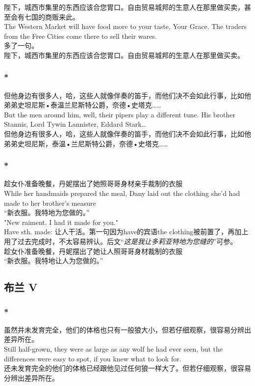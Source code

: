 \documentclass[12pt,a4paper]{article}
\newcommand{\h}[1]{{\color{red}#1}\\}
\newcommand{\la}[1]{{\color{blue}#1}\\}
\begin{document}
\subsubsection{}\la{
	 陛下，城西市集里的东西应该合您胃口。自由贸易城邦的生意人在那里做买卖，甚至会有七国的商贩来此。\\
	 The Western Market will have food more to your taste, Your Grace. The traders from the Free Cities come there to sell their wares.}\h{
	 多了一句。}
	 陛下，城西市集里的东西应该合您胃口。自由贸易城邦的生意人在那里做买卖。
	 
\subsubsection{\color{red}*}\la{
	但他身边有很多人，哈，这些人就像伴奏的笛手，而他们决不会如此行事，比如他弟弟史坦尼斯•泰温兰尼斯特公爵，奈德•史塔克……\\
	But the men around him, well, their pipers play a different tune. His brother Stannis, Lord Tywin Lannister, Eddard Stark\ldots}
	但他身边有很多人，哈，这些人就像伴奏的笛手，而他们决不会如此行事，比如他弟弟史坦尼斯，泰温•兰尼斯特公爵，奈德•史塔克……
	
\subsubsection{\color{red}*}\la{
	趁女仆准备晚餐，丹妮摆出了她照哥哥身材亲手裁制的衣服\\
	While her handmaids prepared the meal, Dany laid out the clothing she'd had made to her brother's measure\\
	“新衣服。我特地为您做的。”\\
	"New raiment. I had it made for you."}\h{
	Have sth. made: 让人干活。第一句因为have的宾语the clothing被前置了，再加上用了过去完成时，不太容易辨认。后文“\emph{这是我让多莉亚特地为您缝的}”可参。}
	趁女仆准备晚餐，丹妮摆出了她让人照哥哥身材裁制的衣服\\
	“新衣服。我特地让人为您做的。”　
	
				
\subsection{布兰 V}
\subsubsection{\color{red}*}\la{
	虽然并未发育完全，他们的体格也只有一般狼大小，但若仔细观察，很容易分辨出差异所在。\\
	Still half-grown, they were as large as any wolf he had ever seen, but the differences were easy to spot, if you knew what to look for.}
	还未发育完全的他们的体格已经跟他见过任何狼一样大了。但若仔细观察，很容易分辨出差异所在。
	
\end{document}
